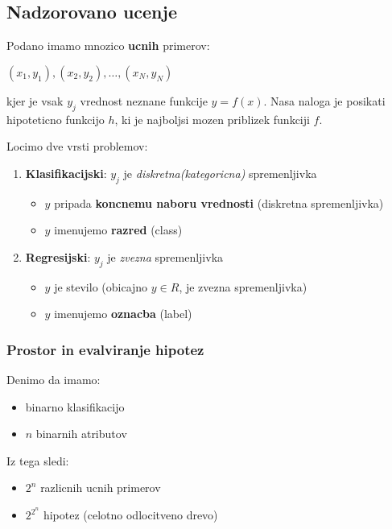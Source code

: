 \documentclass{article}
\begin{document}
\begin{multicols}{2}
	\subsection{Nadzorovano ucenje}
	Podano imamo mnozico \textbf{ucnih} primerov:

	\begin{center}
		\begin{math}
			(x_1, y_1), (x_2, y_2), \dots, (x_N, y_N)
		\end{math}
	\end{center}
	kjer je vsak $y_j$ vrednost neznane funkcije $y = f(x)$.
	Nasa naloga je posikati hipoteticno funkcijo $h$, ki je najboljsi
	mozen priblizek funkciji $f$.

	Locimo dve vrsti problemov:
	\begin{enumerate}
		\item \textbf{Klasifikacijski}: $y_j$ je \textit{diskretna(kategoricna)} spremenljivka
		      \begin{itemize}
			      \item $y$ pripada \textbf{koncnemu naboru vrednosti} (diskretna spremenljivka)
			      \item $y$ imenujemo \textbf{razred} (class)
		      \end{itemize}
		\item \textbf{Regresijski}: $y_j$ je \textit{zvezna} spremenljivka
		      \begin{itemize}
			      \item $y$ je stevilo (obicajno $y \in R$, je zvezna spremenljivka)
			      \item $y$ imenujemo \textbf{oznacba} (label)
		      \end{itemize}
	\end{enumerate}

	\subsubsection{Prostor in evalviranje hipotez}
	Denimo da imamo:
	\begin{itemize}
		\item binarno klasifikacijo
		\item $n$ binarnih atributov
	\end{itemize}
	Iz tega sledi:
	\begin{itemize}
		\item $2^n$ razlicnih ucnih primerov
		\item $2^{2^n}$ hipotez (celotno odlocitveno drevo)
	\end{itemize}


\end{multicols}
\end{document}

